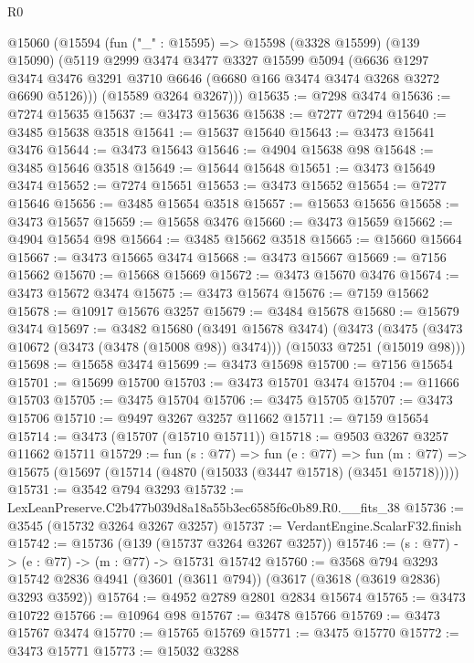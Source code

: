 \begin{lexlean}{R0}
\begin{coremodule}
  @15060
    (@15594
      (fun ("_" : @15595) =>
      @15598
        (@3328 @15599)
        (@139 @15090)
        (@5119
          @2999
          @3474
          @3477
          @3327
          @15599
          @5094
          (@6636
            @1297
            @3474
            @3476
            @3291
            @3710
            @6646
            (@6680 @166 @3474 @3474 @3268 @3272 @6690 @5126)))
        (@15589 @3264 @3267)))
@15635 := @7298 @3474
@15636 := @7274 @15635
@15637 := @3473 @15636
@15638 := @7277 @7294
@15640 := @3485 @15638 @3518
@15641 := @15637 @15640
@15643 := @3473 @15641 @3476
@15644 := @3473 @15643
@15646 := @4904 @15638 @98
@15648 := @3485 @15646 @3518
@15649 := @15644 @15648
@15651 := @3473 @15649 @3474
@15652 := @7274 @15651
@15653 := @3473 @15652
@15654 := @7277 @15646
@15656 := @3485 @15654 @3518
@15657 := @15653 @15656
@15658 := @3473 @15657
@15659 := @15658 @3476
@15660 := @3473 @15659
@15662 := @4904 @15654 @98
@15664 := @3485 @15662 @3518
@15665 := @15660 @15664
@15667 := @3473 @15665 @3474
@15668 := @3473 @15667
@15669 := @7156 @15662
@15670 := @15668 @15669
@15672 := @3473 @15670 @3476
@15674 := @3473 @15672 @3474
@15675 := @3473 @15674
@15676 := @7159 @15662
@15678 := @10917 @15676 @3257
@15679 := @3484 @15678
@15680 := @15679 @3474
@15697 := @3482
    @15680
    (@3491 @15678 @3474)
    (@3473 (@3475 (@3473 @10672 (@3473 (@3478 (@15008 @98)) @3474))) (@15033 @7251 (@15019 @98)))
@15698 := @15658 @3474
@15699 := @3473 @15698
@15700 := @7156 @15654
@15701 := @15699 @15700
@15703 := @3473 @15701 @3474
@15704 := @11666 @15703
@15705 := @3475 @15704
@15706 := @3475 @15705
@15707 := @3473 @15706
@15710 := @9497 @3267 @3257 @11662
@15711 := @7159 @15654
@15714 := @3473 (@15707 (@15710 @15711))
@15718 := @9503 @3267 @3257 @11662 @15711
@15729 := fun (s : @77) =>
  fun (e : @77) =>
  fun (m : @77) => @15675 (@15697 (@15714 (@4870 (@15033 (@3447 @15718) (@3451 @15718)))))
@15731 := @3542 @794 @3293
@15732 := LexLeanPreserve.C2b477b039d8a18a55b3ec6585f6c0b89.R0.__fits_38
@15736 := @3545 (@15732 @3264 @3267 @3257)
@15737 := VerdantEngine.ScalarF32.finish
@15742 := @15736 (@139 (@15737 @3264 @3267 @3257))
@15746 := (s : @77) -> (e : @77) -> (m : @77) -> @15731 @15742
@15760 := @3568
    @794
    @3293
    @15742
    @2836
    @4941
    (@3601 (@3611 @794))
    (@3617 (@3618 (@3619 @2836) @3293 @3592))
@15764 := @4952 @2789 @2801 @2834 @15674
@15765 := @3473 @10722
@15766 := @10964 @98
@15767 := @3478 @15766
@15769 := @3473 @15767 @3474
@15770 := @15765 @15769
@15771 := @3475 @15770
@15772 := @3473 @15771
@15773 := @15032 @3288

\end{coremodule}
\end{lexlean}
